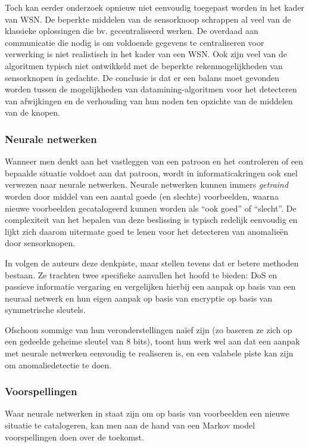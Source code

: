 Toch kan eerder onderzoek opnieuw niet eenvoudig toegepast worden in het kader
van WSN. De beperkte middelen van de sensorknoop schrappen al veel van de
klassieke oplossingen die bv. gecentraliseerd werken. De overdaad aan
communicatie die nodig is om voldoende gegevens te centraliseren voor
verwerking is niet realistisch in het kader van een WSN. Ook zijn veel van de
algoritmen typisch niet ontwikkeld met de beperkte rekenmogelijkheden van
sensorknopen in gedachte. De conclusie is dat er een balans moet gevonden
worden tussen de mogelijkheden van datamining-algoritmen voor het detecteren
van afwijkingen en de verhouding van hun noden ten opzichte van de middelen van
de knopen.

\subsubsection*{Neurale netwerken}
\label{subsubsection:neuralnetworks}

Wanneer men denkt aan het vastleggen van een patroon en het controleren of een
bepaalde situatie voldoet aan dat patroon, wordt in informaticakringen ook snel
verwezen naar neurale netwerken. Neurale netwerken kunnen immers
\emph{getraind} worden door middel van een aantal goede (en slechte)
voorbeelden, waarna nieuwe voorbeelden gecatalogeerd kunnen worden als ``ook
goed'' of ``slecht''. De complexiteit van het bepalen van deze beslissing is
typisch redelijk eenvoudig en lijkt zich daarom uitermate goed te lenen voor
het detecteren van anomalie\"en door sensorknopen.

In \citep{ramesh2012wireless} volgen de auteurs deze denkpiste, maar stellen
tevens dat er betere methoden bestaan. Ze trachten twee specifieke aanvallen
het hoofd te bieden: DoS en passieve informatie vergaring en vergelijken
hierbij een aanpak op basis van een neuraal netwerk en hun eigen aanpak op
basis van encryptie op basis van symmetrische sleutels.

Ofschoon sommige van hun veronderstellingen na\"ief zijn (zo baseren ze zich op
een gedeelde geheime sleutel van 8 bits), toont hun werk wel aan dat een aanpak
met neurale netwerken eenvoudig te realiseren is, en een valabele piste kan
zijn om anomaliedetectie te doen.

\subsubsection*{Voorspellingen}
\label{subsubsection:predictions}

Waar neurale netwerken in staat zijn om op basis van voorbeelden een nieuwe
situatie te catalogeren, kan men aan de hand van een Markov model
voorspellingen doen over de toekomst.


